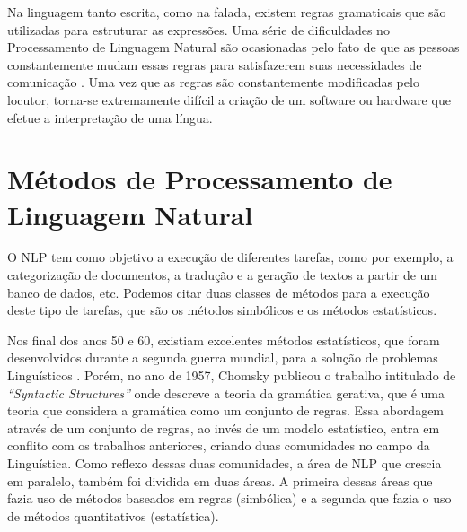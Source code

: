Na linguagem tanto escrita, como na falada, existem regras gramaticais que são
utilizadas para estruturar as expressões. Uma série de dificuldades no Processamento de
Linguagem Natural são ocasionadas pelo fato de que as pessoas constantemente
mudam essas regras para satisfazerem suas necessidades de comunicação
\cite{manningschutze1999}. Uma vez que as regras são constantemente modificadas
pelo locutor, torna-se extremamente difícil a criação de um software ou hardware
que efetue a interpretação de uma língua.


%
%
%

\section{Métodos de Processamento de Linguagem Natural}

O \ac{NLP} tem como objetivo a execução de diferentes tarefas, como por exemplo,
a categorização de documentos, a tradução e a geração de textos a partir de um
banco de dados, etc. Podemos citar duas classes de métodos para a execução deste
tipo de tarefas, que são os métodos simbólicos e os métodos estatísticos.

Nos final dos anos 50 e 60, existiam excelentes métodos estatísticos, que foram
desenvolvidos durante a segunda guerra mundial, para a solução de problemas
Linguísticos \cite{shannon48}.
Porém, no ano de 1957, Chomsky publicou o trabalho intitulado de
\textit{``Syntactic Structures''} onde descreve a
teoria da gramática gerativa, que é uma teoria que considera a
gramática como um conjunto de regras. Essa abordagem através de um conjunto de
regras, ao invés de um modelo estatístico, entra em conflito com os trabalhos
anteriores, criando duas comunidades no campo da Linguística. Como reflexo
dessas duas comunidades, a área de \ac{NLP} que crescia em paralelo, também foi
dividida em duas áreas. A primeira dessas áreas que fazia uso de métodos
baseados em regras (simbólica) e a segunda que fazia o uso de métodos quantitativos (estatística).


